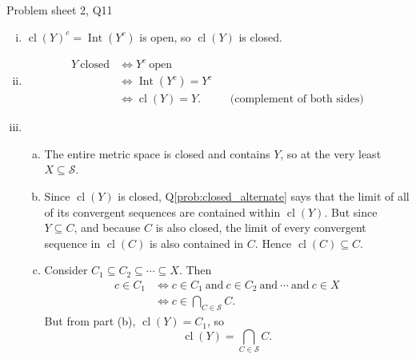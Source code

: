 \begin{problem}{Problem sheet 2, Q11}{}
    \begin{enumerate}[i)]
        \item $\operatorname{cl}(Y)^c = \operatorname{Int}(Y^c)$ is open, so $\operatorname{cl}(Y)$ is closed.
        \item \begin{align*}
            Y \ \text{closed} &\iff Y^c \ \text{open} \\
                &\iff \operatorname{Int}(Y^c) = Y^c \\
                &\iff \operatorname{cl}(Y) = Y .
                    &&\text{(complement of both sides)}
        \end{align*}
        \item \begin{enumerate}[(a)]
            \item The entire metric space is closed and contains $Y$, so at the very least $X \subseteq \mathcal{S}$.
            \item Since $\operatorname{cl}(Y)$ is closed, Q\ref{prob:closed_alternate} says that the limit of all of its convergent sequences are contained within $\operatorname{cl}(Y)$. But since $Y \subseteq C$, and because $C$ is also closed, the limit of every convergent sequence in $\operatorname{cl}(C)$ is also contained in $C$. Hence $\operatorname{cl}(C) \subseteq C$.
            \item Consider $C_1 \subseteq C_2 \subseteq \cdots \subseteq X$. Then
                \begin{align*}
                    c \in C_1 &\iff c \in C_1
                        \ \text{and} \ c \in C_2
                        \ \text{and} \ \cdots 
                        \ \text{and} \ c \in X \\
                        &\iff c \in \bigcap_{C \in \mathcal{S}} C .
                \end{align*}
            But from part (b), $\operatorname{cl}(Y) = C_1$, so
                $$ \operatorname{cl}(Y)
                    = \bigcap_{C \in \mathcal{S}} C . $$
        \end{enumerate}
    \end{enumerate}
    
\end{problem}

